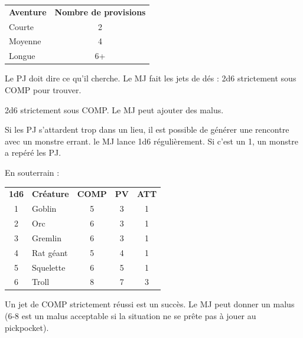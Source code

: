 \begin{frame}[b]
{\begin{center}
\begin{tabular}{lc}
\textbf{Aventure} & \textbf{Nombre de provisions} \\
Courte & 2 \\
Moyenne & 4 \\
Longue & 6+ \\
\end{tabular}
\end{center}


Le PJ doit dire ce qu'il cherche. Le MJ fait les jets de dés : 2d6 strictement sous COMP pour trouver.


2d6 strictement sous COMP. Le MJ peut ajouter des malus.


Si les PJ s'attardent trop dans un lieu, il est possible de générer une rencontre avec un monstre errant. le MJ lance 1d6 régulièrement. Si c'est un 1, un monstre a repéré les PJ.

En souterrain :

\begin{center}
\begin{tabular}{clccc}
\textbf{1d6} &  \textbf{Créature} &  \textbf{COMP} &  \textbf{PV} &  \textbf{ATT} \\
    1 & Goblin     &      5 &    3 &     1 \\
    2 & Orc        &      6 &    3 &     1 \\
    3 & Gremlin    &      6 &    3 &     1 \\
    4 & Rat géant  &      5 &    4 &     1 \\
    5 & Squelette  &      6 &    5 &     1 \\
    6 & Troll      &      8 &    7 &     3 \\
\end{tabular}
\end{center}


Un jet de COMP strictement réussi est un succès. Le MJ peut donner un malus (6-8 est un malus acceptable si la situation ne se prête pas à jouer au pickpocket).

}
\end{frame}

